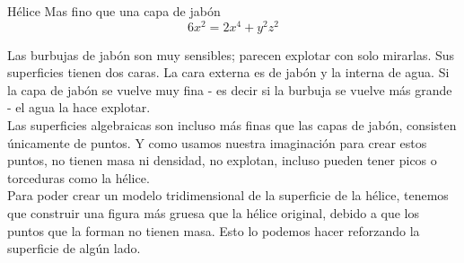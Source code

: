 \begin{surferPage}{Hélice}
Mas fino que una capa de jabón\\
  \smallskip
\[6x^2	= 2x^4	+ y^2	z^2\]

\singlespacing
Las burbujas de jabón son muy sensibles; parecen explotar con solo mirarlas. Sus superficies tienen dos caras. La cara externa es de jabón y la interna de agua. Si la capa de jabón se vuelve muy fina - es decir si la burbuja se vuelve más grande - el agua la hace explotar.\\
\vspace{0,3cm}
Las superficies algebraicas son incluso más finas que las capas de jabón, consisten únicamente de puntos. Y como usamos nuestra imaginación para crear estos puntos, no tienen masa ni densidad, no explotan, incluso pueden tener picos o torceduras como la hélice.\\
\vspace{0,3cm}
Para poder crear un modelo tridimensional de la superficie de la hélice, tenemos que construir una figura más gruesa que la hélice original, debido a que los puntos que la forman no tienen masa. Esto lo podemos hacer reforzando la superficie de algún lado.
\end{surferPage}
